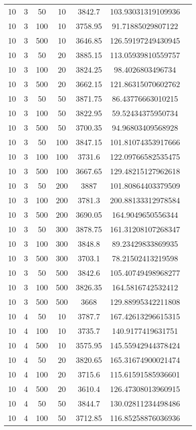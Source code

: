 {\begin{longtabu}{S
S
S
S
S
S[round-mode=places,round-precision=0]
S[round-mode=places,round-precision=0]}
10 & 3 & 50 & 10 & 3842.7 & 103.93031319109936 \\
10 & 3 & 100 & 10 & 3758.95 & 91.71885029807122 \\
10 & 3 & 500 & 10 & 3646.85 & 126.59197249430945 \\
10 & 3 & 50 & 20 & 3885.15 & 113.05939810559757 \\
10 & 3 & 100 & 20 & 3824.25 & 98.4026803496734 \\
10 & 3 & 500 & 20 & 3662.15 & 121.86315070602762 \\
10 & 3 & 50 & 50 & 3871.75 & 86.43776663010215 \\
10 & 3 & 100 & 50 & 3822.95 & 59.52434375950734 \\
10 & 3 & 500 & 50 & 3700.35 & 94.96803409568928 \\
10 & 3 & 50 & 100 & 3847.15 & 101.81074353917666 \\
10 & 3 & 100 & 100 & 3731.6 & 122.09766582535475 \\
10 & 3 & 500 & 100 & 3667.65 & 129.48215127962618 \\
10 & 3 & 50 & 200 & 3887 & 101.80864403379509 \\
10 & 3 & 100 & 200 & 3781.3 & 200.88133312978584 \\
10 & 3 & 500 & 200 & 3690.05 & 164.9049650556344 \\
10 & 3 & 50 & 300 & 3878.75 & 161.31208107268347 \\
10 & 3 & 100 & 300 & 3848.8 & 89.23429833869935 \\
10 & 3 & 500 & 300 & 3703.1 & 78.21502413219598 \\
10 & 3 & 50 & 500 & 3842.6 & 105.40749498968277 \\
10 & 3 & 100 & 500 & 3826.35 & 164.5816742532412 \\
10 & 3 & 500 & 500 & 3668 & 129.88995342211808 \\
10 & 4 & 50 & 10 & 3787.7 & 167.42613296615315 \\
10 & 4 & 100 & 10 & 3735.7 & 140.9177419631751 \\
10 & 4 & 500 & 10 & 3575.95 & 145.55942944378424 \\
10 & 4 & 50 & 20 & 3820.65 & 165.31674900021474 \\
10 & 4 & 100 & 20 & 3715.6 & 115.61591585936601 \\
10 & 4 & 500 & 20 & 3610.4 & 126.47308013960915 \\
10 & 4 & 50 & 50 & 3844.7 & 130.02811234498486 \\
10 & 4 & 100 & 50 & 3712.85 & 116.85258876036936 \\

\end{longtabu}}
